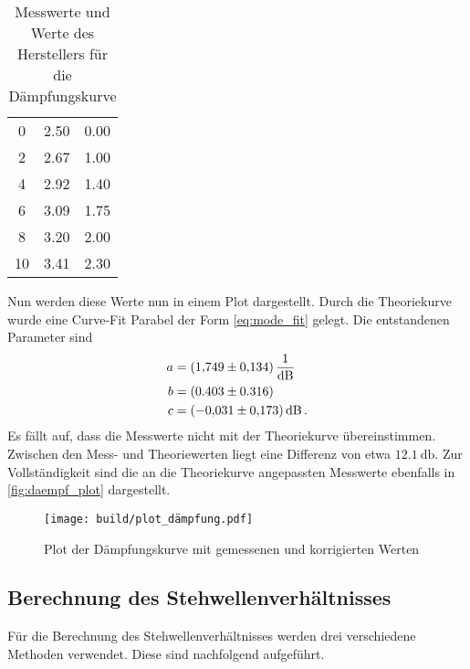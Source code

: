 \begin{table}
    \centering
    \caption{Messwerte und Werte des Herstellers für die Dämpfungskurve}
    \label{tab:dämpfung}
    \begin{tabular}{S[table-format=2.0] S[table-format=1.2] S[table-format=1.2]}
        \toprule
         &  &  \\
         & 2.50 & 0.00\\
        2 & 2.67 & 1.00\\
        4 & 2.92 & 1.40\\
        6 & 3.09 & 1.75\\
        8 & 3.20 & 2.00\\
        10 & 3.41 & 2.30\\
        \bottomrule
    \end{tabular}
\end{table}

Nun werden diese Werte nun in einem Plot dargestellt.
Durch die Theoriekurve wurde eine Curve-Fit Parabel der Form \autoref{eq:mode_fit} gelegt.
Die entstandenen Parameter sind 
\begin{align*}
    a &= \SI{1.749+-0.134}{\per\decibel} \\
    b &= (0.403 \pm 0.316) \\
    c &= \SI{-0.031+-0.173}{\decibel} \, .
\end{align*}
Es fällt auf, dass die Messwerte nicht mit der Theoriekurve übereinstimmen.
Zwischen den Mess- und  Theoriewerten liegt eine Differenz von etwa $\SI{12.1}{\decibel}$.
Zur Vollständigkeit sind die an die Theoriekurve angepassten Messwerte ebenfalls in \autoref{fig:daempf_plot} dargestellt.

\begin{figure}
    \centering
    \texttt{[image: build/plot\_dämpfung.pdf]}
    \caption{Plot der Dämpfungskurve mit gemessenen und korrigierten Werten}
    \label{fig:daempf_plot}
\end{figure}

\subsection{Berechnung des Stehwellenverhältnisses}
\label{ssec:a4}

Für die Berechnung des Stehwellenverhältnisses werden drei verschiedene Methoden verwendet.
Diese sind nachfolgend aufgeführt.

